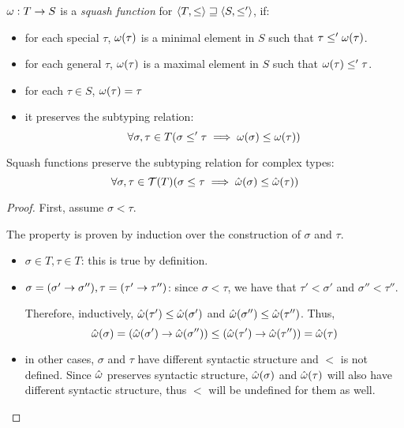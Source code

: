\documentclass[main.tex]{subfiles}
\begin{document}
\begin{defn}
    $\omega: T \rightarrow S$ is a \emph{squash function} for
    $\langle T, \leq \rangle \sqsupseteq \langle S, \leq' \rangle$, if:
    \begin{itemize}
        \item for each special $\tau$, $\omega(\tau)$ is a minimal element in $S$ such that
            $\tau \leq' \omega(\tau)$.
        \item for each general $\tau$, $\omega(\tau)$ is a maximal element in $S$ such that
            $\omega(\tau) \leq' \tau$.
        \item for each $\tau \in S$, $\omega(\tau) = \tau$
        \item it preserves the subtyping relation:
            \[ \forall \sigma, \tau \in T (\sigma \leq' \tau \implies
                \omega(\sigma) \leq \omega(\tau)) \]
    \end{itemize}
\end{defn}

\begin{property}
    \label{prop:squash:preserve}
    Squash functions preserve the subtyping relation for complex types:
    \[ \forall \sigma, \tau \in \mathcal{T}( T ) (\sigma \leq \tau \implies
        \hat{\omega}(\sigma) \leq \hat{\omega}(\tau)) \]
\end{property}
\begin{proof}
    First, assume $\sigma \less \tau$.

    The property is proven by induction over the construction of $\sigma$
    and $\tau$.

    \begin{itemize}
        \item $\sigma \in T, \tau \in T$: this is true by definition.
        \item $\sigma = (\sigma' \rightarrow \sigma''), \tau = (\tau' \rightarrow \tau'')$:
            since $\sigma \less \tau$, we have that $\tau' \less \sigma'$
            and $\sigma'' \less \tau''$.

            Therefore, inductively, $\hat{\omega}(\tau') \leq \hat{\omega}(\sigma')$
            and $\hat{\omega}(\sigma'') \leq \hat{\omega}(\tau'')$. Thus,
            \[
                \hat{\omega}(\sigma) = (\hat{\omega}(\sigma') \rightarrow \hat{\omega}(\sigma''))
                \leq
                (\hat{\omega}(\tau') \rightarrow \hat{\omega}(\tau'')) = \hat{\omega}(\tau)
            \]
        \item in other cases, $\sigma$ and $\tau$ have different syntactic
            structure and $\less$ is not defined. Since $\hat{\omega}$ preserves
            syntactic structure, $\hat{\omega}(\sigma)$ and $\hat{\omega}(\tau)$
            will also have different syntactic structure, thus $\less$ will
            be undefined for them as well.
    \end{itemize}
\end{proof}
\end{document}
